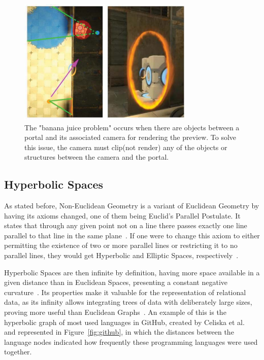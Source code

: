\begin{figure}[t]
    \centering
     \includegraphics[width=0.75\textwidth]{NOVAthesisFiles/Images/papers/banana-juice.png}
     \caption[Example of the 'banana juice problem'.]
     {The "banana juice problem" occurs when there are objects between a portal and its associated camera for rendering the preview.
     To solve this issue, the camera must clip(not render) any of the objects or structures between the camera and the portal.~\cite{Murray2019}}
     \label{fig:banana-juice}
\end{figure}

\subsection{Hyperbolic Spaces}
\label{sec:hyperbolic-spaces}


As stated before, Non-Euclidean Geometry is a variant of Euclidean Geometry by having its axioms changed, one of them 
being Euclid's Parallel Postulate.
It states that through any given point not on a line there passes exactly one line parallel to that line in the same plane~\cite{Eryk2018}. 
If one were to change this axiom to either permitting the existence of two or more parallel lines or restricting it to no parallel lines, 
they would get Hyperbolic and Elliptic Spaces, respectively~\cite{Pisani2019}.

Hyperbolic Spaces are then infinite by definition, having more space available in a given distance than in Euclidean Spaces, presenting a 
constant negative curvature~\cite{Pisani2019}. Its properties make it valuable for the representation of relational data, as its infinity allows 
integrating trees of data with deliberately large sizes, proving more useful than Euclidean Graphs~\cite{Eryk2017, Liu2019}. 
An example of this is the hyperbolic graph of most used languages in GitHub, created by Celiska et al.~\cite{Celiska2017} and represented in 
Figure~\ref{fig:github}, 
in which the distances between the language nodes indicated how frequently these programming languages were used together.

